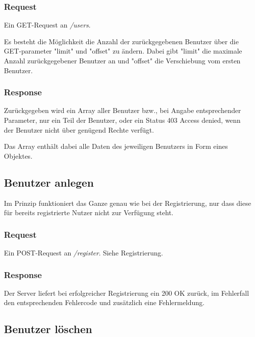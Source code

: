 \documentclass[ngerman]{scrartcl}
\begin{document}
		\subsubsection*{Request}
		
		Ein GET-Request an \textit{/users}.
		
		Es besteht die Möglichkeit die Anzahl der zurückgegebenen Benutzer über die GET-parameter "limit" und "offset" zu ändern. Dabei gibt "limit" die maximale Anzahl zurückgegebener Benutzer an und "offset" die Verschiebung vom ersten Benutzer.
		
		\subsubsection*{Response}
		
		Zurückgegeben wird ein Array aller Benutzer bzw., bei Angabe entsprechender Parameter, nur ein Teil der Benutzer, oder ein Status 403 Access denied, wenn der Benutzer nicht über genügend Rechte verfügt.
		
		Das Array enthält dabei alle Daten des jeweiligen Benutzers in Form eines Objektes.
	
	\subsection{Benutzer anlegen}
	
		Im Prinzip funktioniert das Ganze genau wie bei der Registrierung, nur dass diese für bereits registrierte Nutzer nicht zur Verfügung steht.
	
		\subsubsection*{Request}
		
		Ein POST-Request an \textit{/register}. Siehe Registrierung.
		
		\subsubsection*{Response}
		
		Der Server liefert bei erfolgreicher Registrierung ein 200 OK zurück, im Fehlerfall den entsprechenden Fehlercode und zusätzlich eine Fehlermeldung.
	
	\subsection{Benutzer löschen}
	
\end{document}
